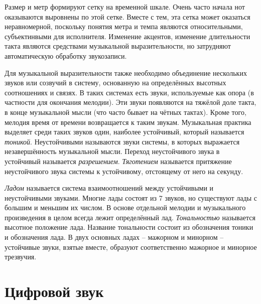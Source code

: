 Размер и метр формируют сетку на временной шкале. Очень часто начала нот
оказываются выровнены по этой сетке. Вместе с тем, эта сетка может оказаться
неравномерной, поскольку понятия метра и темпа являются относительными,
субъектинвыми для исполнителя. Изменение акцентов, изменение длительности такта
являются средствами музыкальной выразительности, но затрудняют автоматическую
обработку звукозаписи.

Для музыкальной выразительности также необходимо объединение нескольких звуков
или созвучий в систему, основанную на определённых высотных соотношениях и
связях. В таких системах есть звуки, используемые как опора (в частности для
окончания мелодии). Эти звуки появляются на тяжёлой доле такта, в конце
музыкальной мысли (что часто бывает на чётных тактах). Кроме того, мелодия время
от времени возвращается к таким звукам. Музыкальная практика выделяет среди
таких звуков один, наиболее устойчивый, который называется \emph{тоникой}.
Неустойчивыми называются звуки системы, в которых выражается незавершённость
музыкальной мысли. Переход неустойчивого звука в устойчивый называется
\emph{разрешением}. \emph{Тяготением} называется притяжение неустойчивого звука
системы к устойчивому, отстоящему от него на секунду.

\emph{Ладом} называется система взаимоотношений между устойчивыми и
неустойчивыми звуками. Многие лады состоят из 7 звуков, но существуют лады с
большим и меньшим их числом. В основе отдельной мелодии и музыкального
произведения в целом всегда лежит определённый лад. \emph{Тональностью}
называется высотное положение лада. Название тональности состоит из обозначения
тоники и обозначения лада. В двух основных ладах -- мажорном и минорном --
устойчивые звуки, взятые вместе, образуют соответственно мажорное и минорное
трезвучия.

\section{Цифровой звук} \label{sectT_digit}


